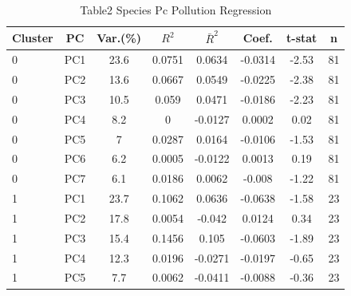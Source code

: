 
\begin{table}[htbp]
    \centering
    \small
    \caption{Table2 Species Pc Pollution Regression}
    \label{tab:table2_species_pc_pollution_regression}
    \begin{tabular}{lccccccc}
        \toprule
        Cluster & PC & Var.(\%) & \(R^2\) & \(\bar{R}^2\) & Coef. & t-stat & n \\
        \midrule
        0 & PC1 & 23.6 & 0.0751 & 0.0634 & -0.0314 & -2.53 & 81 \\
        0 & PC2 & 13.6 & 0.0667 & 0.0549 & -0.0225 & -2.38 & 81 \\
        0 & PC3 & 10.5 & 0.059 & 0.0471 & -0.0186 & -2.23 & 81 \\
        0 & PC4 & 8.2 & 0 & -0.0127 & 0.0002 & 0.02 & 81 \\
        0 & PC5 & 7 & 0.0287 & 0.0164 & -0.0106 & -1.53 & 81 \\
        0 & PC6 & 6.2 & 0.0005 & -0.0122 & 0.0013 & 0.19 & 81 \\
        0 & PC7 & 6.1 & 0.0186 & 0.0062 & -0.008 & -1.22 & 81 \\
        \midrule
        1 & PC1 & 23.7 & 0.1062 & 0.0636 & -0.0638 & -1.58 & 23 \\
        1 & PC2 & 17.8 & 0.0054 & -0.042 & 0.0124 & 0.34 & 23 \\
        1 & PC3 & 15.4 & 0.1456 & 0.105 & -0.0603 & -1.89 & 23 \\
        1 & PC4 & 12.3 & 0.0196 & -0.0271 & -0.0197 & -0.65 & 23 \\
        1 & PC5 & 7.7 & 0.0062 & -0.0411 & -0.0088 & -0.36 & 23 \\
        \bottomrule
    \end{tabular}
\end{table}
